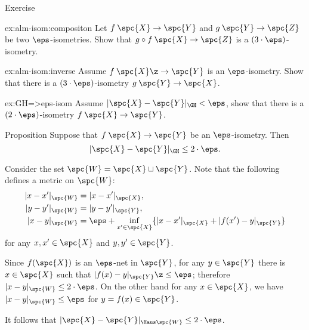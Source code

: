 \begin{thm}{Exercise}\label{ex:alm-isom}
\begin{subthm}{ex:alm-isom:compositon}
Let $f\:\spc{X}\to \spc{Y}$ and $g\:\spc{Y}\to \spc{Z}$ be two $\eps$-isometries.
Show that $g\circ f\: \spc{X}\to \spc{Z}$ is a $(3\cdot\eps)$-isometry.
\end{subthm}

\begin{subthm}{ex:alm-isom:inverse}
Assume $f\: \spc{X} \z\to \spc{Y}$ is an $\eps$-isometry.
Show that there is a $(3\cdot\eps)$-isometry 
$g\: \spc{Y}\to \spc{X}$.
\end{subthm}

\begin{subthm}{ex:GH=>eps-isom}
 Assume $|\spc{X}-\spc{Y}|_{\GH}<\eps$, show that there is a $(2\cdot\eps)$-isometry 
$f\: \spc{X}\to \spc{Y}$.
\end{subthm}
\end{thm}

\begin{thm}{Proposition}\label{prop:alm-isom=>GH}
Suppose that $f\: \spc{X}\to \spc{Y}$ be an $\eps$-isometry.
Then 
\[|\spc{X}-\spc{Y}|_{\GH}\le 2\cdot \eps.\]
\end{thm}

 Consider the set $\spc{W}=\spc{X}\sqcup \spc{Y}$.
Note that the following defines a metric on $\spc{W}$:
\begin{align*}
|x-x'|_{\spc{W}}&=|x-x'|_{\spc{X}},
\\
|y-y'|_{\spc{W}}&=|y-y'|_{\spc{Y}},
\\
|x-y|_{\spc{W}}&=\eps+\inf_{x'\in \spc{X}}\{|x-x'|_{\spc{X}}+|f(x')-y|_{\spc{Y}}\}
\end{align*}
for any $x,x'\in \spc{X}$ and $y,y'\in \spc{Y}$.

Since $f(\spc{X})$ is an $\eps$-net in $\spc{Y}$,
for any $y\in \spc{Y}$ there is $x\in \spc{X}$ such that $|f(x)-y|_{\spc{Y}}\z\le\eps$;
therefore $|x-y|_{\spc{W}}\le 2\cdot\eps$.
On the other hand for any $x\in \spc{X}$, we have $|x-y|_{\spc{W}}\le\eps$
for $y=f(x)\in \spc{Y}$.

It follows that $|\spc{X}-\spc{Y}|_{\Haus\spc{W}}\le 2\cdot\eps$.
\qedsf























